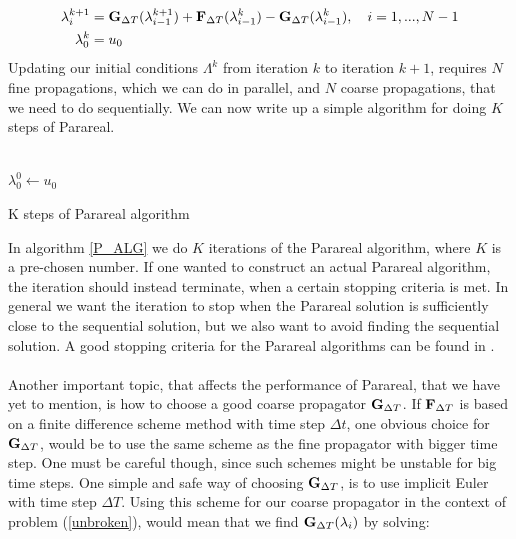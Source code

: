 \begin{align}
\lambda_{i}^{k+1} &= \bold G_ {\Delta T}(\lambda_{i-1}^{k+1})+\bold F_ {\Delta T}( \lambda_{i-1}^{k})-\bold G_ {\Delta T}( \lambda_{i-1}^{k}), \quad i=1,...,N-1 \label{pred_corr_PR} \\
\lambda_0^k &= u_0
\end{align}
Updating our initial conditions $\Lambda^k$ from iteration $k$ to iteration $k+1$, requires $N$ fine propagations, which we can do in parallel, and $N$ coarse propagations, that we need to do sequentially. We can now write up a simple algorithm for doing $K$ steps of Parareal.
\\
\\
\begin{algorithm}[H]
$\lambda^0_0\leftarrow u_0$\;
\caption{K steps of Parareal algorithm\label{P_ALG}}
\end{algorithm}
\noindent
In algorithm \ref{P_ALG} we do $K$ iterations of the Parareal algorithm, where $K$ is a pre-chosen number. If one wanted to construct an actual Parareal algorithm, the iteration should instead terminate, when a certain stopping criteria is met. In general we want the iteration to stop when the Parareal solution is sufficiently close to the sequential solution, but we also want to avoid finding the sequential solution. A good stopping criteria for the Parareal algorithms can be found in \cite{lepsa2010efficient}.
\\
\\
Another important topic, that affects the performance of Parareal, that we have yet to mention, is how to choose a good coarse propagator $\bold G_{\Delta T}$. If $\bold F_{\Delta T}$ is based on a finite difference scheme method with time step $\Delta t$, one obvious choice for $\bold G_{\Delta T}$, would be to use the same scheme as the fine propagator with bigger time step. One must be careful though, since such schemes might be unstable for big time steps. One simple and safe way of choosing $\bold G_{\Delta T}$, is to use implicit Euler with time step $\Delta T$. Using this scheme for our coarse propagator in the context of problem (\ref{unbroken}), would mean that we find $\bold{G}_{\Delta T}(\lambda_i)$ by solving:
